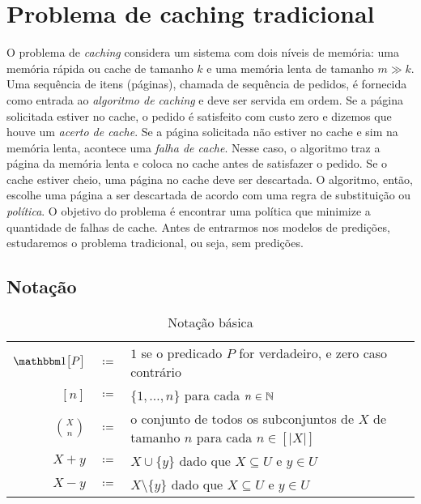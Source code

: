\chapter{Problema de caching tradicional}

O problema de \emph{caching} considera um sistema com dois níveis de memória: uma memória rápida ou cache de tamanho \(k\) e uma memória lenta de tamanho \(m \gg k\). Uma sequência de itens (páginas), chamada de sequência de pedidos, é fornecida como entrada ao \emph{algoritmo de caching} e deve ser servida em ordem. Se a página solicitada estiver no cache, o pedido é satisfeito com custo zero e dizemos que houve um \emph{acerto de cache}. Se a página solicitada não estiver no cache e sim na memória lenta, acontece uma \emph{falha de cache}. Nesse caso, o algoritmo traz a página da memória lenta e coloca no cache antes de satisfazer o pedido. Se o cache estiver cheio, uma página no cache deve ser descartada. O algoritmo, então, escolhe uma página a ser descartada de acordo com uma regra de substituição ou \emph{política}. O objetivo do problema é encontrar uma política que minimize a quantidade de falhas de cache. Antes de entrarmos nos modelos de predições, estudaremos o problema tradicional, ou seja, sem predições.

\section{Notação}

\bgroup
	\renewcommand{\arraystretch}{1.2}
	\begin{table}[htbp]
	  \caption{Notação básica}
          \label{tbl:notation}
	  \centering
	  \begin{tabular}{r c p{13cm}}
	    \toprule
            \(\ind{P}\) & \(\coloneqq\)& \(1\) se o predicado \(P\) for verdadeiro, e zero caso contrário \\
            \([n]\)
            & \(\coloneqq\)
            & \(\{1, \dotsc, n\}\) para cada \(n
              \in \mathbb{N}\)\\
            \(\binom{X}{n}\) & \(\coloneqq\)& o conjunto de todos os subconjuntos de \(X\) de tamanho \(n\) para cada \(n \in [|X|]\) \\
            \(X + y\) & \(\coloneqq\)& \(X \cup \{y\}\) dado que \(X\subseteq U\) e \(y \in U\) \\
            \(X - y\) & \(\coloneqq\)& \(X \setminus \{y\}\) dado que \(X\subseteq U\) e \(y \in U\)\\
            \bottomrule
	  \end{tabular}
	\end{table}
\egroup

